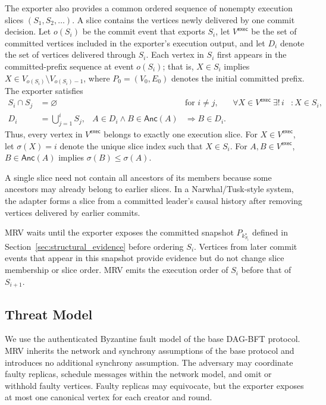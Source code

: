 The exporter also provides a common ordered sequence of nonempty execution slices $(S_1,S_2,\ldots)$. A slice contains the vertices newly delivered by one commit decision. Let $o(S_i)$ be the commit event that exports $S_i$, let $V^{\mathsf{exec}}$ be the set of committed vertices included in the exporter's execution output, and let $D_i$ denote the set of vertices delivered through $S_i$. Each vertex in $S_i$ first appears in the
committed-prefix sequence at event $o(S_i)$; that is, $X\in S_i$ implies $X\in V_{o(S_i)}\setminus V_{o(S_i)-1}$, where
$P_0=(V_0,E_0)$ denotes the initial committed prefix. The exporter satisfies
\[
\begin{aligned}
S_i\cap S_j &= \varnothing && \text{for }i\neq j, &
\forall X\in V^{\mathsf{exec}}\ \exists!\,i &: X\in S_i,\\
D_i &= \bigcup_{j=1}^{i}S_j, &
A\in D_i\land B\in\mathsf{Anc}(A)
&\Longrightarrow B\in D_i .
\end{aligned}
\]
Thus, every vertex in $V^{\mathsf{exec}}$ belongs to exactly one execution slice. For $X\in V^{\mathsf{exec}}$, let $\sigma(X)=i$ denote the unique slice index such that $X\in S_i$. For $A,B\in V^{\mathsf{exec}}$, $B\in\mathsf{Anc}(A)$ implies $\sigma(B)\leq\sigma(A)$.

A single slice need not contain all ancestors of its members because some ancestors may already belong to earlier slices. In a Narwhal/Tusk-style system, the adapter forms a slice from a committed leader's causal history after removing vertices delivered by earlier commits.


MRV waits until the exporter exposes the committed snapshot
$P_{k^\star_{S_i}}$ defined in Section~\ref{sec:structural_evidence} before ordering $S_i$.
Vertices from later commit events that appear in this snapshot provide evidence but do not change slice membership or slice order. MRV emits the execution order of $S_i$ before that of $S_{i+1}$.


\subsection{Threat Model}
\label{sec:threat}

We use the authenticated Byzantine fault model of the base DAG-BFT protocol. MRV inherits the network and synchrony assumptions of the base protocol and introduces no additional synchrony assumption. The adversary may coordinate faulty replicas, schedule messages within the network model, and omit or withhold faulty vertices. Faulty replicas may equivocate, but the exporter exposes at most one canonical vertex for each creator and round.

